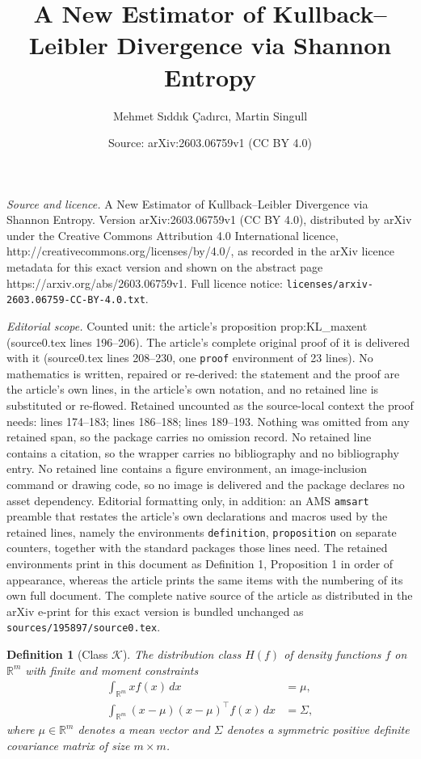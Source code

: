 \documentclass[10pt,a4paper]{amsart}
\title{A New Estimator of Kullback--Leibler Divergence via Shannon Entropy}
\author{\footnotesize Mehmet S\i dd\i k \c{C}ad\i rc\i, \footnotesize Martin Singull}
\date{Source: arXiv:2603.06759v1 (CC BY 4.0)}
\newtheorem{definition}{Definition}
\begin{document}
\maketitle

\noindent\emph{Source and licence.} A New Estimator of Kullback--Leibler Divergence via Shannon Entropy. Version arXiv:2603.06759v1 (CC BY 4.0), distributed by arXiv under the Creative Commons Attribution 4.0 International licence, http://creativecommons.org/licenses/by/4.0/, as recorded in the arXiv licence metadata for this exact version and shown on the abstract page https://arxiv.org/abs/2603.06759v1. Full licence notice: \texttt{licenses/arxiv-2603.06759-CC-BY-4.0.txt}.\par\smallskip

\noindent\textit{Editorial scope.} Counted unit: the article's proposition prop:KL\_maxent (source0.tex lines 196--206). The article's complete original proof of it is delivered with it (source0.tex lines 208--230, one \texttt{proof} environment of 23 lines). No mathematics is written, repaired or re-derived: the statement and the proof are the article's own lines, in the article's own notation, and no retained line is substituted or re-flowed.  Retained uncounted as the source-local context the proof needs: lines 174--183; lines 186--188; lines 189--193.  Nothing was omitted from any retained span, so the package carries no omission record.  No retained line contains a citation, so the wrapper carries no bibliography and no bibliography entry.  No retained line contains a figure environment, an image-inclusion command or drawing code, so no image is delivered and the package declares no asset dependency.  Editorial formatting only, in addition: an AMS \texttt{amsart} preamble that restates the article's own declarations and macros used by the retained lines, namely the environments \texttt{definition}, \texttt{proposition} on separate counters, together with the standard packages those lines need.  The retained environments print in this document as Definition 1, Proposition 1 in order of appearance, whereas the article prints the same items with the numbering of its own full document.  The complete native source of the article as distributed in the arXiv e-print for this exact version is bundled unchanged as \texttt{sources/195897/source0.tex}.
\begin{definition}[Class $\mathcal{K}$]\label{def:classK_KL}
The distribution class $H(f)$ of density functions $f$ on $\mathbb{R}^m$
with finite and moment constraints
\begin{align*}
\int_{\mathbb{R}^m} {x} f({x})\,d{x} &= {\mu}, \\
\int_{\mathbb{R}^m} ({x} - {\mu})({x} - {\mu})^{\top} f({x})\,d{x}
&= {\Sigma},
\end{align*}
where ${ \mu} \in \mathbb{R}^m$ denotes a mean vector and ${{\Sigma}}$ denotes a symmetric positive definite covariance matrix of size $m \times m$.
\end{definition}
\end{document}
